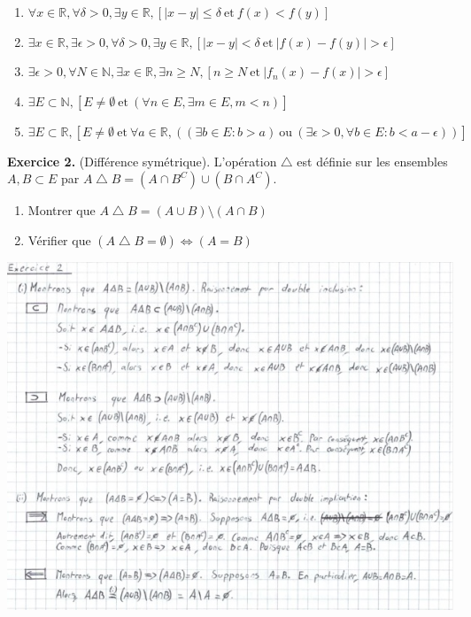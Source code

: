 \documentclass[a4paper, 10pt]{report}
\providecommand{\abs}[1]{\lvert#1\rvert}
\begin{document}
	\colorbox{solution}
	{
		\begin{minipage}{0.9\textwidth}
			\begin{enumerate}[label=(\roman*)]
				\item $\forall x \in \mathbb{R},
				\forall \delta > 0,
				\exists y \in \mathbb{R},
				[\abs{x - y} \leq \delta \ \text{et}\ f(x) < f(y)]$
				\item $\exists x \in \mathbb{R},
				\exists \epsilon > 0,
				\forall \delta > 0,
				\exists y \in \mathbb{R},
				[\abs{x - y} < \delta \ \text{et}\ \abs{f(x) - f(y)} > \epsilon]$
				\item $\exists \epsilon > 0,
				\forall N \in \mathbb{N},
				\exists x \in \mathbb{R},
				\exists n \geq N,
				[n \geq N \ \text{et}\ \abs{f_n(x) - f(x)} > \epsilon]$
				\item $\exists E \subset \mathbb{N},
				[E \neq \emptyset \ \text{et}\ (\forall n \in E,
				\exists m \in E, m < n)]$
				\item $\exists E \subset \mathbb{R},
				[E \neq \emptyset \ \text{et}\ \forall a \in \mathbb{R},
				((\exists b \in E : b > a)\
				\text{ou}\
				(\exists \epsilon > 0,
				\forall b \in E : b < a - \epsilon))]$
			\end{enumerate}
		\end{minipage}
	}
	
	\vspace{5mm}
	\noindent
	\textbf{Exercice 2.} (Différence symétrique). L'opération
	$\bigtriangleup$ est définie sur les ensembles $A, B \subset E$
	par $A \bigtriangleup B = (A \cap B^C) \cup (B \cap A^C)$.
	
	\begin{enumerate}[label=(\roman*)]
		\item Montrer que $A \bigtriangleup B =
			(A \cup B) \setminus (A \cap B)$
		\item Vérifier que $(A \bigtriangleup B = \emptyset)
			\iff (A = B)$
	\end{enumerate}
	
	\includegraphics{ex02.jpg}
	
\end{document}
